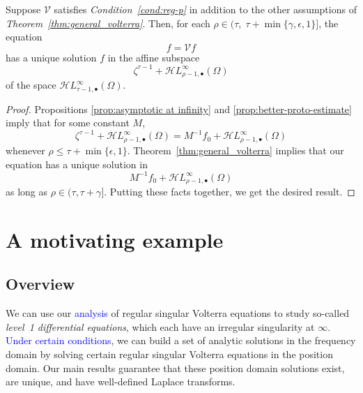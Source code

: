 \documentclass[review]{siamart220329}
\newcommand{\singexp}[2]{\mathcal{H}L^\infty_{#1, #2}}
\newcommand{\singexpalg}[1]{\singexp{#1}{\bullet}}
\newcommand{\volterra}{\mathcal{V}}
\newcommand{\solproto}{f_0}
\newcommand{\domain}{\Omega}
\begin{document}
\color{blue}\begin{proposition}\label{prop:alt-general_volterra}
Suppose $\volterra$ satisfies {\em Condition~\eqref{cond:reg-p}} in addition to the other assumptions of {\em Theorem~\ref{thm:general_volterra}}. Then, for each $\rho \in (\tau,\;\tau + \min\{\gamma, \epsilon, 1\}]$, the equation
\[f = \volterra f\]
has a unique solution $f$ in the affine subspace
\[ \zeta^{\tau-1}+\singexpalg{\rho-1}(\domain) \]
of the space $\singexpalg{\tau-1}(\domain)$.
\end{proposition}\color{black}
\begin{proof}
Propositions \ref{prop:asymptotic at infinity} and \ref{prop:better-proto-estimate} imply that for some constant $M$,
\[ \zeta^{\tau-1} + \singexpalg{\rho-1}(\domain) = M^{-1}\solproto + \singexpalg{\rho-1}(\domain) \]
whenever $\rho \le \tau + \min\{\epsilon, 1\}$. Theorem~\ref{thm:general_volterra} implies that our equation has a unique solution in
\[ M^{-1}\solproto + \singexpalg{\rho-1}(\domain) \]
as long as $\rho \in (\tau, \tau + \gamma]$. Putting these facts together, we get the desired result.
\end{proof}
\section{A motivating example}\label{sec:example}
\subsection{Overview}
We can use our \textcolor{blue}{analysis} of regular singular Volterra equations to study so-called \textit{level~1 differential equations}, which each have an irregular singularity at $\infty$. \textcolor{blue}{Under certain conditions}, we can build a set of analytic solutions in the frequency domain by solving certain regular singular Volterra equations in the position domain. Our main results guarantee that these position domain solutions exist, are unique, and have well-defined Laplace transforms.
\end{document}
